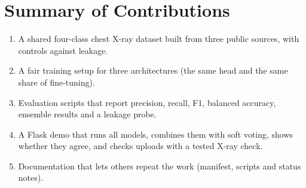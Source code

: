\section{Summary of Contributions}

\begin{enumerate}
    \item A shared four-class chest X-ray dataset built from three public sources, with controls against leakage.
    \item A fair training setup for three architectures (the same head and the same share of fine-tuning).
    \item Evaluation scripts that report precision, recall, F1, balanced accuracy, ensemble results and a leakage probe.
    \item A Flask demo that runs all models, combines them with soft voting, shows whether they agree, and checks uploads with a tested X-ray check.
    \item Documentation that lets others repeat the work (manifest, scripts and status notes).
\end{enumerate}
